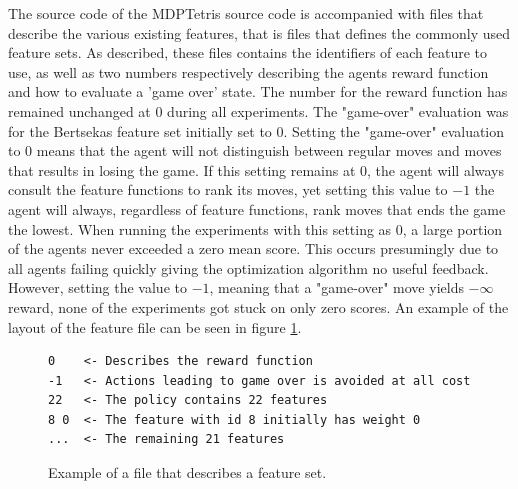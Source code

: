 The source code of the MDPTetris source code 
is accompanied with files that describe the
various existing features, that is files that defines 
the commonly used feature sets. As described, these files contains the identifiers of 
each feature to use, as well as two numbers respectively describing 
the agents reward function and how to evaluate a 'game over' state. 
The number for the reward function has remained unchanged at $0$ 
during all experiments. The "game-over" evaluation was for the
Bertsekas feature set initially set to $0$. Setting the 
"game-over" evaluation to $0$ means that the agent will not 
distinguish between regular moves and moves that results in losing
the game. If this setting remains at 0, the agent will always consult the
feature functions to rank its moves, yet setting this value to $-1$
the agent will always, regardless of feature functions, rank moves that ends
the game the lowest.
When running the experiments with this setting as $0$, a large portion
of the agents never exceeded a zero mean score. This occurs presumingly 
due to all agents failing quickly giving the optimization algorithm no 
useful feedback. However, setting the value
to $-1$, meaning that a "game-over" move yields $-\infty$ reward, 
none of the experiments got stuck on only zero scores. An example
of the layout of the feature file can be seen in figure \ref{fig:featfile}.
\begin{figure}[H]
\centering
\begin{lstlisting}
0    <- Describes the reward function
-1   <- Actions leading to game over is avoided at all cost
22   <- The policy contains 22 features
8 0  <- The feature with id 8 initially has weight 0
...  <- The remaining 21 features
\end{lstlisting}
\caption{Example of a file that describes a feature set. \label{fig:featfile}}
\end{figure}

